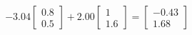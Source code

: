 \documentclass[preview]{standalone}
\begin{document}
\begin{align*}
-3.04 \begin{bmatrix} 0.8 \\ 0.5 \end{bmatrix} + 2.00 \begin{bmatrix} 1 \\ 1.6 \end{bmatrix} = \begin{bmatrix} -0.43 \\ 1.68 \end{bmatrix}
\end{align*}
\end{document}
